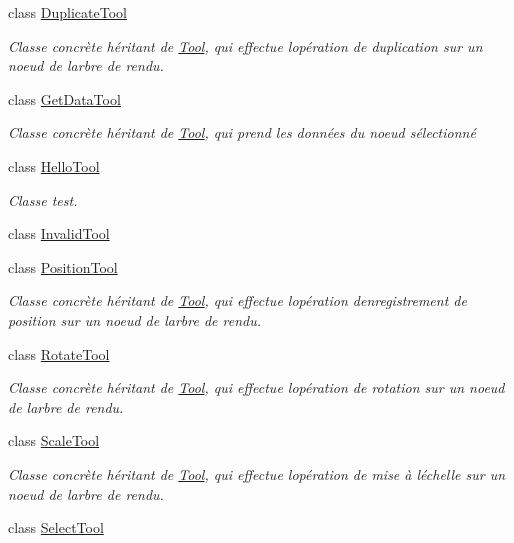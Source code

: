 \begin{DoxyCompactItemize}
class \hyperlink{class_duplicate_tool}{Duplicate\+Tool}
\begin{DoxyCompactList}\small\item\em Classe concrète héritant de \hyperlink{class_tool}{Tool}, qui effectue l\textquotesingle{}opération de duplication sur un noeud de l\textquotesingle{}arbre de rendu. \end{DoxyCompactList}\item 
class \hyperlink{class_get_data_tool}{Get\+Data\+Tool}
\begin{DoxyCompactList}\small\item\em Classe concrète héritant de \hyperlink{class_tool}{Tool}, qui prend les données du noeud sélectionné \end{DoxyCompactList}\item 
class \hyperlink{class_hello_tool}{Hello\+Tool}
\begin{DoxyCompactList}\small\item\em Classe test. \end{DoxyCompactList}\item 
class \hyperlink{class_invalid_tool}{Invalid\+Tool}
\item 
class \hyperlink{class_position_tool}{Position\+Tool}
\begin{DoxyCompactList}\small\item\em Classe concrète héritant de \hyperlink{class_tool}{Tool}, qui effectue l\textquotesingle{}opération d\textquotesingle{}enregistrement de position sur un noeud de l\textquotesingle{}arbre de rendu. \end{DoxyCompactList}\item 
class \hyperlink{class_rotate_tool}{Rotate\+Tool}
\begin{DoxyCompactList}\small\item\em Classe concrète héritant de \hyperlink{class_tool}{Tool}, qui effectue l\textquotesingle{}opération de rotation sur un noeud de l\textquotesingle{}arbre de rendu. \end{DoxyCompactList}\item 
class \hyperlink{class_scale_tool}{Scale\+Tool}
\begin{DoxyCompactList}\small\item\em Classe concrète héritant de \hyperlink{class_tool}{Tool}, qui effectue l\textquotesingle{}opération de mise à l\textquotesingle{}échelle sur un noeud de l\textquotesingle{}arbre de rendu. \end{DoxyCompactList}\item 
class \hyperlink{class_select_tool}{Select\+Tool}

\end{DoxyCompactItemize}
